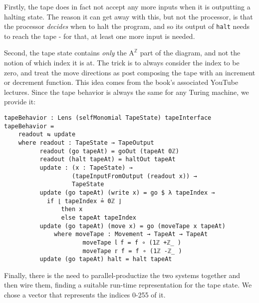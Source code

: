 Firstly, the tape does in fact not accept any more inputs when it is outputting a halting state. The reason it can get away with this, but not the processor, is that the processor \textit{decides} when to halt the program, and so its output of \texttt{halt} needs to reach the tape - for that, at least one more input is needed.

Second, the tape state contains \textit{only} the $\text{A}^{\mathbb{Z}}$ part of the diagram, and not the notion of which index it is at. The trick is to always consider the index to be zero, and treat the move directions as post composing the tape with an increment or decrement function. This idea comes from the book's associated YouTube lectures. Since the tape behavior is always the same for any Turing machine, we provide it:

\begin{verbatim}
tapeBehavior : Lens (selfMonomial TapeState) tapeInterface
tapeBehavior = 
    readout ⇆ update
    where readout : TapeState → TapeOutput
          readout (go tapeAt) = goOut (tapeAt 0ℤ)
          readout (halt tapeAt) = haltOut tapeAt 
          update : (x : TapeState) → 
                   (tapeInputFromOutput (readout x)) → 
                   TapeState
          update (go tapeAt) (write x) = go $ λ tapeIndex → 
            if ⌊ tapeIndex ≟ 0ℤ ⌋ 
                then x 
                else tapeAt tapeIndex
          update (go tapeAt) (move x) = go (moveTape x tapeAt)
              where moveTape : Movement → TapeAt → TapeAt
                      moveTape 𝕝 f = f ∘ (1ℤ +ℤ_ )
                      moveTape 𝕣 f = f ∘ (1ℤ -ℤ_ )
          update (go tapeAt) halt = halt tapeAt
\end{verbatim}

Finally, there is the need to parallel-productize the two systems together and then wire them, finding a suitable run-time representation for the tape state. We chose a vector that represents the indices 0-255 of it.

